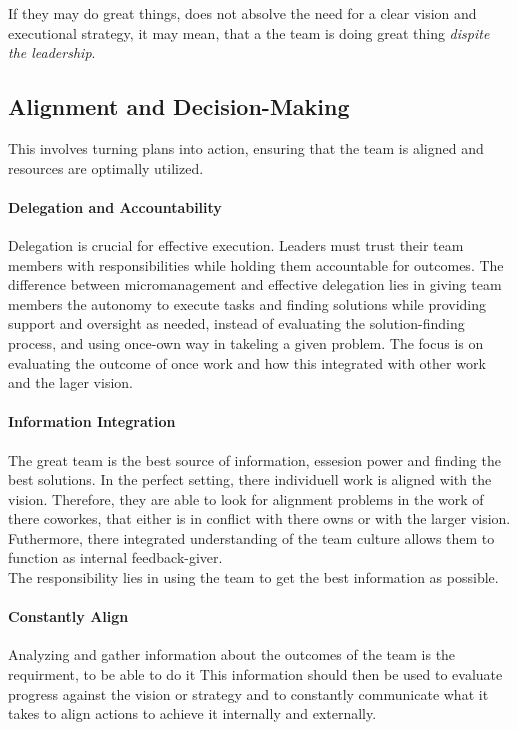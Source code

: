 If they may do great things, does not absolve the need for a clear vision and executional strategy, it may mean, that a the team is doing great thing \textit{dispite the leadership}.

\subsection{Alignment and Decision-Making} \label{responsibility__alignment}
This involves turning plans into action, ensuring that the team is aligned and resources are optimally utilized.

\paragraph{Delegation and Accountability}
Delegation is crucial for effective execution.
Leaders must trust their team members with responsibilities while holding them accountable for outcomes.
The difference between micromanagement and effective delegation lies in giving team members the autonomy to execute tasks and finding solutions while providing support and oversight as needed, instead of evaluating the solution-finding process, and using once-own way in takeling a given problem. The focus is on evaluating the outcome of once work and how this integrated with other work and the lager vision.

\paragraph{Information Integration} The great team is the best source of information, essesion power and finding the best solutions. In the perfect setting, there individuell work is aligned with the vision. Therefore, they are able to look for alignment problems in the work of there coworkes, that either is in conflict with there owns or with the larger vision. Futhermore, there integrated understanding of the team culture allows them to function as internal feedback-giver.\\

The responsibility lies in using the team to get the best information as possible.

\paragraph{Constantly Align}
Analyzing and gather information about the outcomes of the team is the requirment, to be able to do it
This information should then be used to evaluate progress against the vision or strategy and to constantly communicate what it takes to align actions to achieve it internally and externally. 

